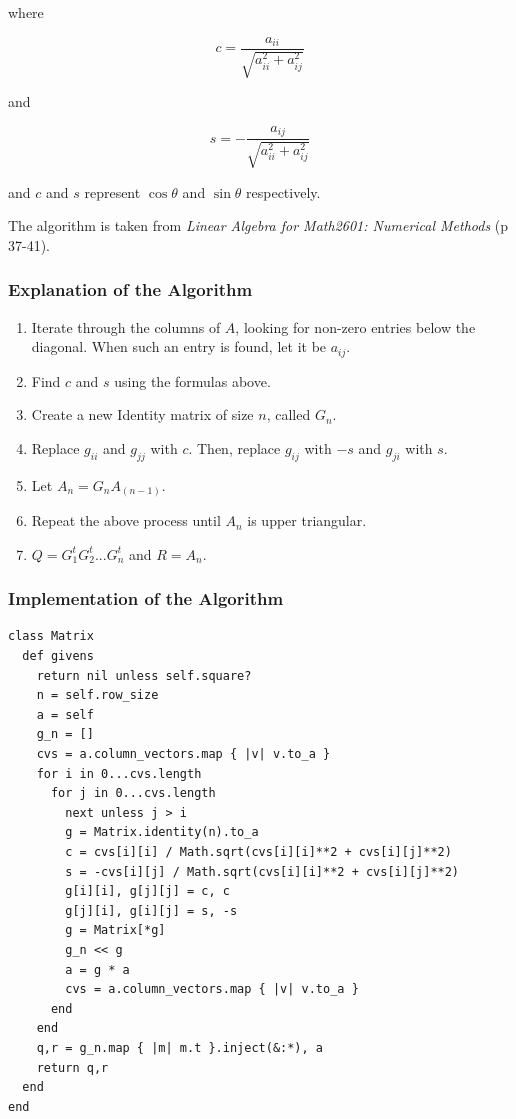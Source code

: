 \documentclass[letterpaper,12pt]{article}
\begin{document}
where

\[c = \frac{a_{ii}}{\sqrt{a^2_{ii} + a^2_{ij}}}\]

and

\[s = - \frac{a_{ij}}{\sqrt{a^2_{ii} + a^2_{ij}}}\]

and $c$ and $s$ represent $\cos{\theta}$ and $\sin{\theta}$ respectively.

The algorithm is taken from \textit{Linear Algebra for Math2601: Numerical Methods}
(p 37-41).

\subsubsection{Explanation of the Algorithm}

\begin{enumerate}
\item Iterate through the columns of $A$, looking for non-zero entries below the diagonal.
  When such an entry is found, let it be $a_{ij}$.

\item Find $c$ and $s$ using the formulas above.

\item Create a new Identity matrix of size $n$, called $G_n$.

\item Replace $g_{ii}$ and $g_{jj}$ with $c$.
  Then, replace $g_{ij}$ with $-s$ and $g_{ji}$ with $s$.

\item Let $A_n = G_n A_{(n - 1)}$.

\item Repeat the above process until $A_n$ is upper triangular.

\item $Q = G_1^t G_2^t ... G_n^t$ and $R = A_n$.

\end{enumerate}

\subsubsection{Implementation of the Algorithm}

\lstset{caption=QR Decomposition via Givens Rotations}
\begin{lstlisting}
class Matrix
  def givens
    return nil unless self.square?
    n = self.row_size
    a = self
    g_n = []
    cvs = a.column_vectors.map { |v| v.to_a }
    for i in 0...cvs.length
      for j in 0...cvs.length
        next unless j > i
        g = Matrix.identity(n).to_a
        c = cvs[i][i] / Math.sqrt(cvs[i][i]**2 + cvs[i][j]**2)
        s = -cvs[i][j] / Math.sqrt(cvs[i][i]**2 + cvs[i][j]**2)
        g[i][i], g[j][j] = c, c
        g[j][i], g[i][j] = s, -s
        g = Matrix[*g]
        g_n << g
        a = g * a
        cvs = a.column_vectors.map { |v| v.to_a }
      end
    end
    q,r = g_n.map { |m| m.t }.inject(&:*), a
    return q,r
  end
end
\end{lstlisting}
\end{document}
